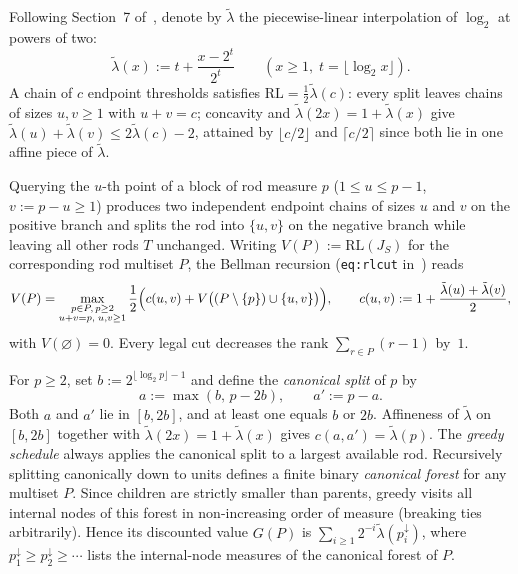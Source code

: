 \documentclass[11pt]{article}
\theoremstyle{plain}
\theoremstyle{definition}
\theoremstyle{remark}
\newcommand{\RL}{\mathrm{RL}}
\begin{document}
Following Section~7 of~\cite{DagaRamu2026}, denote by $\tilde\lambda$ the piecewise-linear interpolation of $\log_2$ at powers of two:
\[
\tilde\lambda(x) := t + \frac{x - 2^t}{2^t} \qquad (x \ge 1,\; t = \lfloor \log_2 x \rfloor).
\]
A chain of $c$ endpoint thresholds satisfies $\RL = \tfrac{1}{2}\tilde\lambda(c)$: every split leaves chains of sizes $u, v \ge 1$ with $u + v = c$; concavity and $\tilde\lambda(2x) = 1 + \tilde\lambda(x)$ give $\tilde\lambda(u) + \tilde\lambda(v) \le 2\tilde\lambda(c) - 2$, attained by $\lfloor c/2 \rfloor$ and $\lceil c/2 \rceil$ since both lie in one affine piece of $\tilde\lambda$.

Querying the $u$-th point of a block of rod measure $p$ ($1 \le u \le p - 1$, $v := p - u \ge 1$) produces two independent endpoint chains of sizes $u$ and $v$ on the positive branch and splits the rod into $\{u, v\}$ on the negative branch while leaving all other rods $T$ unchanged. Writing $V(P) := \RL(J_S)$ for the corresponding rod multiset $P$, the Bellman recursion (\texttt{eq:rlcut} in~\cite{DagaRamu2026}) reads
\begin{equation}\label{eq:bellman}
V(P) = \max_{\substack{p \in P,\, p \ge 2 \\ u + v = p,\; u, v \ge 1}}
\frac{1}{2}\Bigl(c(u, v) + V\bigl((P \setminus \{p\}) \cup \{u, v\}\bigr)\Bigr),
\qquad
c(u, v) := 1 + \frac{\tilde\lambda(u) + \tilde\lambda(v)}{2},
\end{equation}
with $V(\varnothing) = 0$. Every legal cut decreases the rank $\sum_{r \in P}(r - 1)$ by~$1$.

For $p \ge 2$, set $b := 2^{\lfloor \log_2 p \rfloor - 1}$ and define the \emph{canonical split} of $p$ by
\[
a := \max(b,\, p - 2b), \qquad a' := p - a.
\]
Both $a$ and $a'$ lie in $[b, 2b]$, and at least one equals $b$ or $2b$. Affineness of $\tilde\lambda$ on $[b, 2b]$ together with $\tilde\lambda(2x) = 1 + \tilde\lambda(x)$ gives $c(a, a') = \tilde\lambda(p)$.
The \emph{greedy schedule} always applies the canonical split to a largest available rod. Recursively splitting canonically down to units defines a finite binary \emph{canonical forest} for any multiset $P$. Since children are strictly smaller than parents, greedy visits all internal nodes of this forest in non-increasing order of measure (breaking ties arbitrarily). Hence its discounted value $G(P)$ is $\sum_{i \ge 1} 2^{-i} \tilde\lambda(p_i^\downarrow)$, where $p_1^\downarrow \ge p_2^\downarrow \ge \cdots$ lists the internal-node measures of the canonical forest of $P$.
\end{document}
